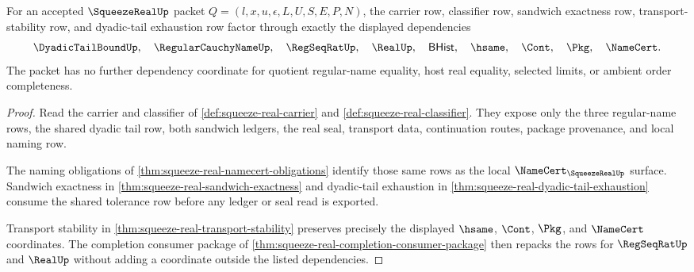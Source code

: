 \begin{theorem}
\label{thm:squeeze-real-scoped-dependency-packet}
For an accepted $\SqueezeRealUp$ packet $Q=(l,x,u,\epsilon,L,U,S,E,P,N)$, the carrier row, classifier row, sandwich exactness row, transport-stability row, and dyadic-tail exhaustion row factor through exactly the displayed dependencies
$$
\DyadicTailBoundUp,\quad \RegularCauchyNameUp,\quad \RegSeqRatUp,\quad \RealUp,\quad \mathsf{BHist},\quad \hsame,\quad \Cont,\quad \Pkg,\quad \NameCert .
$$
The packet has no further dependency coordinate for quotient regular-name equality, host real equality, selected limits, or ambient order completeness.
\end{theorem}
\begin{proof}
Read the carrier and classifier of \autoref{def:squeeze-real-carrier} and \autoref{def:squeeze-real-classifier}. They expose only the three regular-name rows, the shared dyadic tail row, both sandwich ledgers, the real seal, transport data, continuation routes, package provenance, and local naming row.

The naming obligations of \autoref{thm:squeeze-real-namecert-obligations} identify those same rows as the local $\NameCert_{\SqueezeRealUp}$ surface. Sandwich exactness in \autoref{thm:squeeze-real-sandwich-exactness} and dyadic-tail exhaustion in \autoref{thm:squeeze-real-dyadic-tail-exhaustion} consume the shared tolerance row before any ledger or seal read is exported.

Transport stability in \autoref{thm:squeeze-real-transport-stability} preserves precisely the displayed $\hsame$, $\Cont$, $\Pkg$, and $\NameCert$ coordinates. The completion consumer package of \autoref{thm:squeeze-real-completion-consumer-package} then repacks the rows for $\RegSeqRatUp$ and $\RealUp$ without adding a coordinate outside the listed dependencies.
\end{proof}

